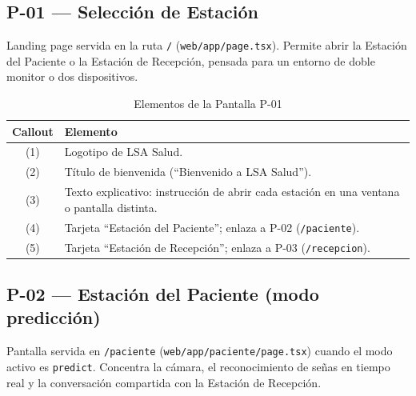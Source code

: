 \subsection{P-01 --- Selección de Estación}

Landing page servida en la ruta \texttt{/} (\texttt{web/app/page.tsx}).
Permite abrir la Estación del Paciente o la Estación de Recepción, pensada
para un entorno de doble monitor o dos dispositivos.


\begin{table}[H]
    \centering
    \caption{Elementos de la Pantalla P-01}
    \label{tab:mock-p01}
    \begin{tabularx}{\textwidth}{c X}
        \toprule
        \textbf{Callout} & \textbf{Elemento} \\
        \midrule
        (1) & Logotipo de LSA Salud. \\
        (2) & Título de bienvenida (``Bienvenido a LSA Salud''). \\
        (3) & Texto explicativo: instrucción de abrir cada estación en una
        ventana o pantalla distinta. \\
        (4) & Tarjeta ``Estación del Paciente''; enlaza a P-02
        (\texttt{/paciente}). \\
        (5) & Tarjeta ``Estación de Recepción''; enlaza a P-03
        (\texttt{/recepcion}). \\
        \bottomrule
    \end{tabularx}
\end{table}

\subsection{P-02 --- Estación del Paciente (modo predicción)}

Pantalla servida en \texttt{/paciente} (\texttt{web/app/paciente/page.tsx})
cuando el modo activo es \texttt{predict}. Concentra la cámara, el
reconocimiento de señas en tiempo real y la conversación compartida con la
Estación de Recepción.



